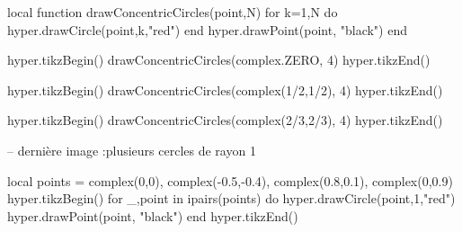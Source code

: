 \documentclass[margin=.2cm,multi,tikz]{standalone}
\begin{document}
\begin{luacode*}
local function drawConcentricCircles(point,N)
	for k=1,N do
		hyper.drawCircle(point,k,"red")
	end
	hyper.drawPoint(point, "black")
end

hyper.tikzBegin()
drawConcentricCircles(complex.ZERO, 4)
hyper.tikzEnd()

hyper.tikzBegin()
drawConcentricCircles(complex(1/2,1/2), 4)
hyper.tikzEnd()

hyper.tikzBegin()
drawConcentricCircles(complex(2/3,2/3), 4)
hyper.tikzEnd()

-- dernière image :plusieurs cercles de rayon 1 

local points = {
	complex(0,0),
	complex(-0.5,-0.4),
	complex(0.8,0.1),
	complex(0,0.9)
}
hyper.tikzBegin()
for _,point in ipairs(points) do
	hyper.drawCircle(point,1,"red")
	hyper.drawPoint(point, "black")
end
hyper.tikzEnd()
\end{luacode*}
\end{document}
